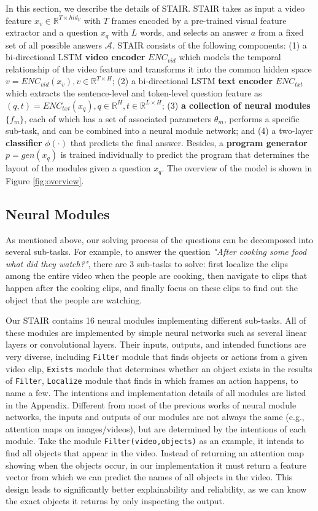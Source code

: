 \documentclass[letterpaper]{article} %
\begin{document}
In this section, we describe the details of STAIR. STAIR takes as input a video feature $x_v \in \mathbb{R}^{T \times hid_V}$ with $T$ frames encoded by a pre-trained visual feature extractor and a question $x_q$ with $L$ words, and selects an answer $a$ from a fixed set of all possible answers $\mathcal{A}$. STAIR consists of the following components: 
(1) a bi-directional LSTM \textbf{video encoder} ${ENC}_{vid}$ which models the temporal relationship of the video feature and transforms it into the common hidden space $v = {ENC}_{vid}(x_v), v \in \mathbb{R}^{T \times H}$; (2) a bi-directional LSTM \textbf{text encoder} ${ENC}_{txt}$ which extracts the sentence-level and token-level question feature as $(q, t)={ENC}_{txt}(x_q), q \in \mathbb{R}^H, t \in \mathbb{R}^{L \times H}$; (3) \textbf{a collection of neural modules} $\{f_m\}$, each of which has a set of associated parameters $\theta_m$, performs a specific sub-task, and can be combined into a neural module network; and (4) a two-layer \textbf{classifier} $\phi(\cdot)$ that predicts the final answer. Besides, a \textbf{program generator} $p = gen(x_q)$ is trained individually to predict the program that determines the layout of the modules given a question $x_q$. The overview of the model is shown in Figure \ref{fig:overview}.

\subsection{Neural Modules}
As mentioned above, our solving process of the questions can be decomposed into several sub-tasks. For example, to answer the question \textit{"After cooking some food what did they watch?"}, there are 3 sub-tasks to solve: first localize the clips among the entire video when the people are cooking, then navigate to clips that happen after the cooking clips, and finally focus on these clips to find out the object that the people are watching.

Our STAIR contains 16 neural modules implementing different sub-tasks. All of these modules are implemented by simple neural networks such as several linear layers or convolutional layers. Their inputs, outputs, and intended functions are very diverse, including \texttt{Filter} module that finds objects or actions from a given video clip, \texttt{Exists} module that determines whether an object exists in the results of \texttt{Filter}, \texttt{Localize} module that finds in which frames an action happens, to name a few. The intentions and implementation details of all modules are listed in the Appendix. Different from most of the previous works of neural module networks, the inputs and outputs of our modules are not always the same (e.g., attention maps on images/videos), but are determined by the intentions of each module. Take the module \texttt{Filter(video,objects)} as an example, it intends to find all objects that appear in the video. Instead of returning an attention map showing when the objects occur, in our implementation it must return a feature vector from which we can predict the names of all objects in the video. This design leads to significantly better explainability and reliability, as we can know the exact objects it returns by only inspecting the output.
\end{document}
